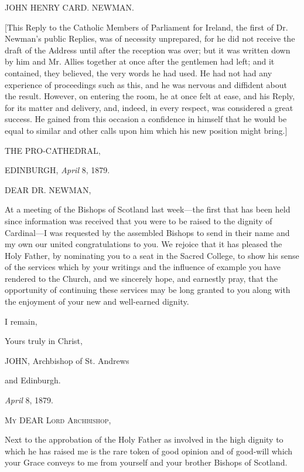 JOHN HENRY CARD.
NEWMAN.

[This Reply to the Catholic Members of Parliament for Ireland, the
first of Dr. Newman's public Replies, was of necessity unprepared, for
he did not receive the draft of the Address until after the reception
was over; but it was written down by him and Mr. Allies together at
once after the gentlemen had left; and it contained, they believed,
the very words he had used. He had not had any experience of
proceedings such as this, and he was nervous and diffident about the
result. However, on entering the room, he at once felt at ease, and
his Reply, for its matter and delivery, and, indeed, in every respect,
was considered a great success. He gained from this occasion a
confidence in himself that he would be equal to similar and other
calls upon him which his new position might bring.]


THE PRO-CATHEDRAL,

EDINBURGH, \emph{April} 8, 1879.

DEAR DR. NEWMAN,

At a meeting of the Bishops of Scotland last week—the first that has
been held since information was received that you were to be raised to
the dignity of Cardinal—I was requested by the assembled Bishops to send in their name and my own our united congratulations to
you. We rejoice that it has pleased the Holy Father, by nominating you
to a seat in the Sacred College, to show his sense of the services
which by your writings and the influence of example you have rendered
to the Church, and we sincerely hope, and earnestly pray, that the
opportunity of continuing these services may be long granted to you
along with the enjoyment of your new and well-earned dignity.

I remain,

Yours truly in Christ,

JOHN, Archbishop of St. Andrews

and Edinburgh.


\emph{April} 8, 1879.

M\textsc{y} DEAR L\textsc{ord}
A\textsc{rchbishop},

Next to the approbation of the Holy Father as involved in the high
dignity to which he has raised me is the rare token of good opinion
and of good-will which your Grace conveys to me from yourself and your
brother Bishops of Scotland.

